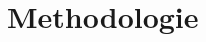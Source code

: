 \begin{comment}
Azure biedt ondersteuning aan voor verschillende niet Microsoft-gerelateerde Infrastructure Automation tools. Configuration Management tools zoals Ansible, Chef en Puppet werden al onderzocht en onderling vergeleken in andere studies \autocite{Microsoft2022a}. 

Ansible biedt goede ondersteuning aan op \newline lange termijn en is simpel in gebruik met goede documentatie. Daarnaast is Ansible een krachtige tool met veel potentieel \autocite{Masek2018}. Het wordt eerder aangeraden voor kleinere projecten door zijn onvolledigheid. Waarbij Chef en Puppet meer compleet zijn en grote projecten beter kan verwerken \autocite{Bertram2016}. 

Naast bovenstaande tools ondersteunt Azure Orchestration tools waaronder Terraform. Deze tool is onveranderlijk ten opzichte van Configuration Management tools. Terraform wordt gebruikt om machines te orkestreren wat eenvoudiger is om meerdere instanties te voorzien. Terwijl Configuration Management tools zich focussen op het configureren van instanties \autocite{Brikman2016}.

Binnen Hogeschool Gent zijn er reeds een aantal studies uitgevoerd naar aspecten die voorkomen in dit onderwerp. Kelvin \textcite{Vermeulen2021} heeft een onderzoek uitgevoerd naar het automatiseren van een Public Cloud-omgeving binnen AWS. Daarnaast heeft Joachim \textcite{VandeKeere2021} een studie uitgevoerd naar het gebruik van Ansible binnen lokale omgevingen. 

In het eerste onderzoek van Vermeulen werd de configuratie van AWS manueel uitgevoerd. Vervolgens werd in het tweede onderzoek van Van der Keere Ansible gebruikt voor een lokale \newline Windows- en Linux-omgeving. In deze studie worden de configuraties van Azure geautomatiseerd. Verder wordt er een Linux-testomgeving opgezet in de Cloud via Ansible.

\end{comment}

\section{Methodologie}%
\label{sec:methodologie}

